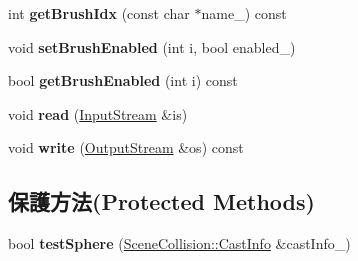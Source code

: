 \begin{DoxyCompactItemize}
\item 
int {\bfseries get\+Brush\+Idx} (const char $\ast$name\+\_\+) const \hypertarget{class_magnum_1_1_scene_collision_1_1_brush_list_acec4b59d499b26aa8612c3711d58e2a2}{}\label{class_magnum_1_1_scene_collision_1_1_brush_list_acec4b59d499b26aa8612c3711d58e2a2}

\item 
void {\bfseries set\+Brush\+Enabled} (int i, bool enabled\+\_\+)\hypertarget{class_magnum_1_1_scene_collision_1_1_brush_list_ae022c51a53265850b1c43d619fde7845}{}\label{class_magnum_1_1_scene_collision_1_1_brush_list_ae022c51a53265850b1c43d619fde7845}

\item 
bool {\bfseries get\+Brush\+Enabled} (int i) const \hypertarget{class_magnum_1_1_scene_collision_1_1_brush_list_ad25b92d0151709d5ec2366d87a2637ff}{}\label{class_magnum_1_1_scene_collision_1_1_brush_list_ad25b92d0151709d5ec2366d87a2637ff}

\item 
void {\bfseries read} (\hyperlink{class_magnum_1_1_input_stream}{Input\+Stream} \&is)\hypertarget{class_magnum_1_1_scene_collision_1_1_brush_list_a98c5d45d02d58c324ceca802bcf75e88}{}\label{class_magnum_1_1_scene_collision_1_1_brush_list_a98c5d45d02d58c324ceca802bcf75e88}

\item 
void {\bfseries write} (\hyperlink{class_magnum_1_1_output_stream}{Output\+Stream} \&os) const \hypertarget{class_magnum_1_1_scene_collision_1_1_brush_list_a6ed464fc255352cd29aaf5ca8c72806f}{}\label{class_magnum_1_1_scene_collision_1_1_brush_list_a6ed464fc255352cd29aaf5ca8c72806f}

\end{DoxyCompactItemize}
\subsection*{保護方法(Protected Methods)}
\begin{DoxyCompactItemize}
\item 
bool {\bfseries test\+Sphere} (\hyperlink{class_magnum_1_1_scene_collision_1_1_cast_info}{Scene\+Collision\+::\+Cast\+Info} \&cast\+Info\+\_\+)\hypertarget{class_magnum_1_1_scene_collision_1_1_brush_list_a2dc6cdbed40f2e8916bcb2488d618907}{}\label{class_magnum_1_1_scene_collision_1_1_brush_list_a2dc6cdbed40f2e8916bcb2488d618907}

\end{DoxyCompactItemize}
